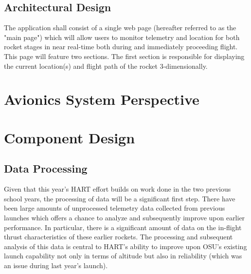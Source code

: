 \documentclass[onecolumn, draftclsnofoot,10pt, compsoc]{IEEEtran}
\begin{document}
\subsection{Architectural Design}


The application shall consist of a single web page (hereafter referred to as the "main page") which will allow users to monitor telemetry and location for both rocket stages in near real-time both during and immediately proceeding flight.
This page will feature two sections.
The first section is responsible for displaying the current location(s) and flight path of the rocket 3-dimensionally.



\section{Avionics System Perspective}



\section{Component Design}







\subsection{Data Processing}
Given that this year's HART effort builds on work done in the two previous school years, the processing of data will be a significant first step. 
There have been large amounts of unprocessed telemetry data collected from previous launches which offers a chance to analyze and subsequently improve upon earlier performance. 
In particular, there is a significant amount of data on the in-flight thrust characteristics of these earlier rockets. 
The processing and subsequent analysis of this data is central to HART's ability to improve upon OSU's existing launch capability not only in terms of altitude but also in reliability (which was an issue during last year's launch).
\end{document}
